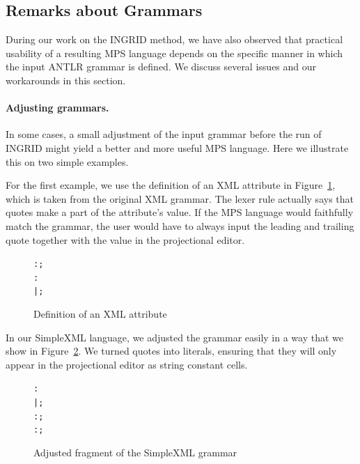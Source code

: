 \subsection{Remarks about Grammars}

During our work on the INGRID method, we have also observed that practical usability of a resulting MPS language depends on the specific manner in which the input ANTLR grammar is defined.
We discuss several issues and our workarounds in this section.

\paragraph{Adjusting grammars.}
In some cases, a small adjustment of the input grammar before the run of INGRID might yield a better and more useful MPS language.
Here we illustrate this on two simple examples.

For the first example, we use the definition of an XML attribute in Figure~\ref{fig:XMLATTRIB}, which is taken from the original XML grammar.
The lexer rule  actually says that quotes make a part of the attribute's value.
If the MPS language would faithfully match the grammar, the user would have to always input the leading and trailing quote together with the value in the projectional editor.

\begin{figure}[ht]
\begin{framed}
\begin{alltt}
   :  \antlrliteral{=}  ;
   :  \antlrregex{~["]*} 
         |  \antlrregex{~[']*}  ;
\end{alltt}
\end{framed}
\caption{Definition of an XML attribute}
\label{fig:XMLATTRIB}
\end{figure}

In our SimpleXML language, we adjusted the grammar easily in a way that we show in Figure~\ref{fig:XMLADJUST}.
We turned quotes into literals, ensuring that they will only appear in the projectional editor as string constant cells.

\begin{figure}[ht]
\begin{framed}
\begin{alltt}
   :    
         |     ;
   : \antlrregex{~["]*} ;
   : \antlrregex{~[']*} ;
\end{alltt}
\end{framed}
\caption{Adjusted fragment of the SimpleXML grammar}
\label{fig:XMLADJUST}
\end{figure}

